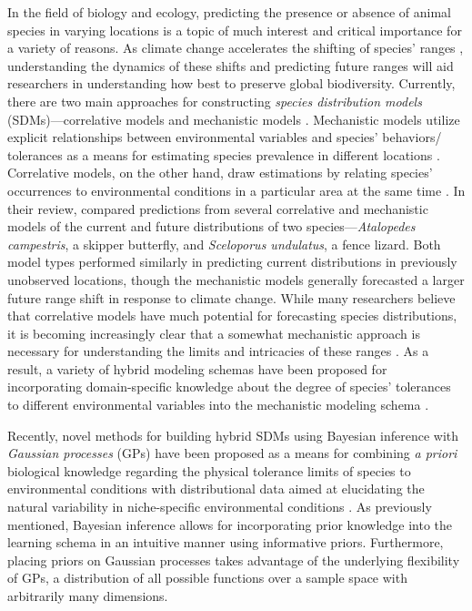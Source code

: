 \documentclass[
  12pt,
]{book}
\theoremstyle{definition}
\theoremstyle{definition}
\theoremstyle{definition}
\theoremstyle{remark}
\begin{document}
In the field of biology and ecology, predicting the presence or absence of animal species in varying locations is a topic of much interest and critical importance for a variety of reasons.
As climate change accelerates the shifting of species' ranges \citep[\citet{Steinbauer2018}]{Parmesan2003}, understanding the dynamics of these shifts and predicting future ranges will aid researchers in understanding how best to preserve global biodiversity.
Currently, there are two main approaches for constructing \emph{species distribution models} (SDMs)---correlative models and mechanistic models \citep[\citet{Kotta2019}]{Buckley2010}.
Mechanistic models utilize explicit relationships between environmental variables and species' behaviors/ tolerances as a means for estimating species prevalence in different locations \citep[\citet{Kotta2019}]{Buckley2010}.
Correlative models, on the other hand, draw estimations by relating species' occurrences to environmental conditions in a particular area at the same time \citep[\citet{Kotta2019}]{Buckley2010}.
In their review, \citet{Buckley2010} compared predictions from several correlative and mechanistic models of the current and future distributions of two species---\emph{Atalopedes campestris}, a skipper butterfly, and \emph{Sceloporus undulatus}, a fence lizard.
Both model types performed similarly in predicting current distributions in previously unobserved locations, though the mechanistic models generally forecasted a larger future range shift in response to climate change.
While many researchers believe that correlative models have much potential for forecasting species distributions, it is becoming increasingly clear that a somewhat mechanistic approach is necessary for understanding the limits and intricacies of these ranges \citep{Kearney2006}.
As a result, a variety of hybrid modeling schemas have been proposed for incorporating domain-specific knowledge about the degree of species' tolerances to different environmental variables into the mechanistic modeling schema \citep[\citet{Kearney2006}]{Buckley2010}.

Recently, novel methods for building hybrid SDMs using Bayesian inference with \emph{Gaussian processes} (GPs) have been proposed as a means for combining \emph{a priori} biological knowledge regarding the physical tolerance limits of species to environmental conditions with distributional data aimed at elucidating the natural variability in niche-specific environmental conditions \citep{Kotta2019}.
As previously mentioned, Bayesian inference allows for incorporating prior knowledge into the learning schema in an intuitive manner using informative priors.
Furthermore, placing priors on Gaussian processes takes advantage of the underlying flexibility of GPs, a distribution of all possible functions over a sample space with arbitrarily many dimensions.
\end{document}
